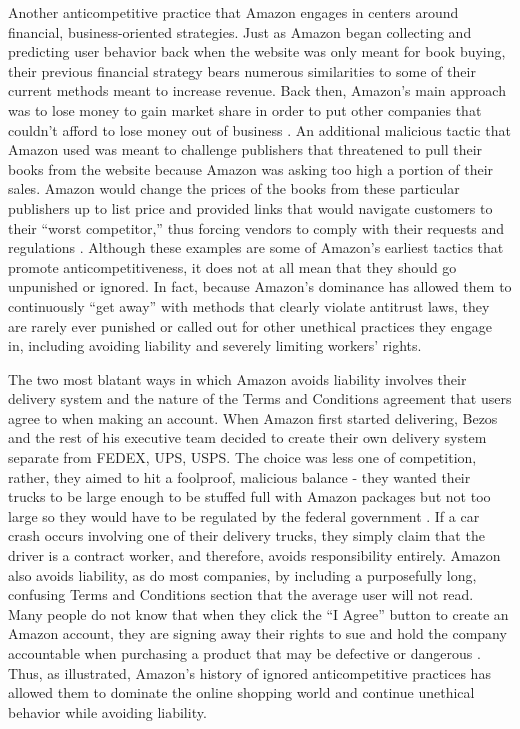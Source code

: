 \documentclass[twoside]{article}
\begin{document}
Another anticompetitive practice that Amazon engages in centers around financial, business-oriented strategies. Just as Amazon began collecting and predicting user behavior back when the website was only meant for book buying, their previous financial strategy bears numerous similarities to some of their current methods meant to increase revenue. Back then, Amazon’s main approach was to lose money to gain market share in order to put other companies that couldn’t afford to lose money out of business \cite{amazon1}. An additional malicious tactic that Amazon used was meant to challenge publishers that threatened to pull their books from the website because Amazon was asking too high a portion of their sales. Amazon would change the prices of the books from these particular publishers up to list price and provided links that would navigate customers to their “worst competitor,” thus forcing vendors to comply with their requests and regulations \cite{amazon1}. Although these examples are some of Amazon’s earliest tactics that promote anticompetitiveness, it does not at all mean that they should go unpunished or ignored. In fact, because Amazon’s dominance has allowed them to continuously “get away” with methods that clearly violate antitrust laws, they are rarely ever punished or called out for other unethical practices they engage in, including avoiding liability and severely limiting workers’ rights.

The two most blatant ways in which Amazon avoids liability involves their delivery system and the nature of the Terms and Conditions agreement that users agree to when making an account. When Amazon first started delivering, Bezos and the rest of his executive team decided to create their own delivery system separate from FEDEX, UPS, USPS. The choice was less one of competition, rather, they aimed to hit a foolproof, malicious balance - they wanted their trucks to be large enough to be stuffed full with Amazon packages but not too large so they would have to be regulated by the federal government \cite{amazon1}. If a car crash occurs involving one of their delivery trucks, they simply claim that the driver is a contract worker, and therefore, avoids responsibility entirely. Amazon also avoids liability, as do most companies, by including a purposefully long, confusing Terms and Conditions section that the average user will not read. Many people do not know that when they click the “I Agree” button to create an Amazon account, they are signing away their rights to sue and hold the company accountable when purchasing a product that may be defective or dangerous \cite{amazon1}. Thus, as illustrated, Amazon’s history of ignored anticompetitive practices has allowed them to dominate the online shopping world and continue unethical behavior while avoiding liability.
\end{document}
